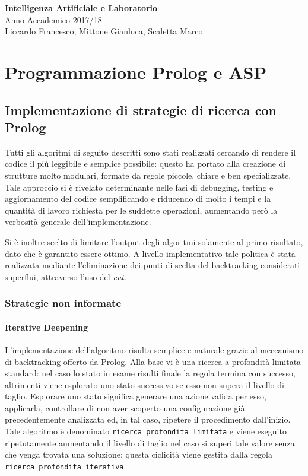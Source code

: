 \documentclass[a4paper,oneside,12pt]{book}
\def \code#1{\texttt{#1}}
\begin{document}
    \begin{center}
    {\LARGE {\bf Intelligenza Artificiale e Laboratorio}\\
    \vspace*{6mm}}
    {\Large Anno Accademico 2017/18}\\
    \vspace*{6mm}
    \vspace*{6mm}
    Liccardo Francesco, Mittone Gianluca, Scaletta Marco
    \end{center}
    \newpage
    \chapter*{Programmazione Prolog e ASP}
    \section*{Implementazione di strategie di ricerca con Prolog}
    Tutti gli algoritmi di seguito descritti sono stati realizzati cercando di rendere il codice il più 	leggibile e semplice possibile: questo ha portato alla creazione di strutture molto modulari, 	formate da regole piccole, chiare e ben specializzate. Tale approccio si è rivelato 	determinante nelle fasi di debugging, testing e aggiornamento del codice semplificando e 	riducendo di molto i tempi e la quantità di lavoro richiesta per le suddette operazioni, 	aumentando però la verbosità generale dell’implementazione.

    Si è inoltre scelto di limitare l’output degli algoritmi solamente al primo risultato, 	dato che è garantito essere ottimo. A livello implementativo tale politica è stata realizzata 	mediante l’eliminazione dei punti di scelta del backtracking considerati superflui, attraverso l’uso del 	\textit{cut}.
    \subsection*{Strategie non informate}
    \subsubsection{Iterative Deepening}

    L’implementazione dell’algoritmo risulta semplice e naturale grazie al meccanismo di backtracking offerto da Prolog. Alla base vi è una ricerca a profondità limitata standard: nel caso lo stato in esame risulti finale la regola termina con successo, altrimenti viene esplorato uno stato successivo se esso non supera il livello di taglio. Esplorare uno stato significa generare una azione valida per esso, applicarla, controllare di non aver scoperto una configurazione già precedentemente analizzata ed, in tal caso, ripetere il procedimento dall’inizio. Tale algoritmo è denominato
    \code{ricerca\_profondita\_limitata} e viene eseguito ripetutamente aumentando il livello di taglio nel caso si superi tale valore senza che venga trovata una soluzione; questa ciclicità viene gestita dalla regola \code{ricerca\_profondita\_iterativa}.
\end{document}

